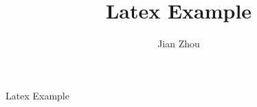 \documentclass{article}
\title{Latex Example}
\author{Jian Zhou}
\begin{document}
\maketitle


Latex Example~\cite{latex-example}



\end{document}
